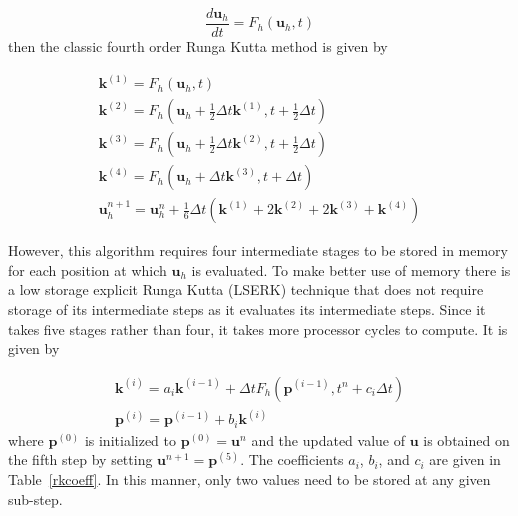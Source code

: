 \documentclass{article}
\begin{document}
\begin{equation}
\frac{d \boldsymbol{u}_h}{d t} = F_h(\boldsymbol{u}_h,t)
\label{timedefn}
\end{equation}
then the classic fourth order Runga Kutta method is given by

\begin{eqnarray}
\boldsymbol{k}^{(1)}=F_h(\boldsymbol{u}_h,t)\\
\boldsymbol{k}^{(2)}=F_h(\boldsymbol{u}_h+\frac{1}{2}\Delta t\boldsymbol{k}^{(1)},t+\frac{1}{2}\Delta t)\\
\boldsymbol{k}^{(3)}=F_h(\boldsymbol{u}_h+\frac{1}{2}\Delta t\boldsymbol{k}^{(2)},t+\frac{1}{2}\Delta t)\\
\boldsymbol{k}^{(4)}=F_h(\boldsymbol{u}_h+\Delta t\boldsymbol{k}^{(3)},t+\Delta t)\\
\boldsymbol{u}_h^{n+1}=\boldsymbol{u}_h^{n}+\frac{1}{6}\Delta t(\boldsymbol{k}^{(1)}+2\boldsymbol{k}^{(2)}+2\boldsymbol{k}^{(3)}+\boldsymbol{k}^{(4)})
\end{eqnarray}

However, this algorithm requires four intermediate stages to be stored
in memory for each position at which $\boldsymbol{u}_h$ is
evaluated. To make better use of memory there is a low storage
explicit Runga Kutta (LSERK) technique that does not require storage
of its intermediate steps as it evaluates its intermediate
steps. Since it takes five stages rather than four, it takes
more processor cycles to compute. It is given by 

\begin{eqnarray}
\boldsymbol{k}^{(i)}=a_i\boldsymbol{k}^{(i-1)}+\Delta t F_h(\boldsymbol{p}^{(i-1)},t^n+c_i\Delta t)\\
\boldsymbol{p}^{(i)}=\boldsymbol{p}^{(i-1)}+b_i\boldsymbol{k}^{(i)}
\end{eqnarray}
where $\boldsymbol{p}^{(0)}$ is initialized to
$\boldsymbol{p}^{(0)}=\boldsymbol{u}^n$ and the updated value of
$\boldsymbol{u}$ is obtained on the fifth step by setting
$\boldsymbol{u}^{n+1}=\boldsymbol{p}^{(5)}$. The coefficients $a_i$, $b_i$, and $c_i$
are given in Table~\ref{rkcoeff}. In this manner, only two values need
to be stored at any given sub-step.
\end{document}
